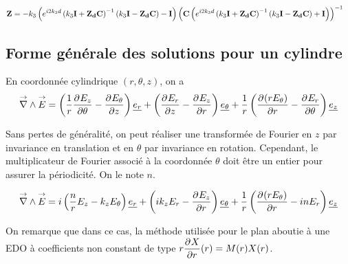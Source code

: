 \begin{align}
    \mat{Z}
    &=-k_3\left(e^{i2 k_3 d} \left(k_3\mat{I} + \mat{Z_d}\mat{C}\right)^{-1}\left(k_3\mat{I} - \mat{Z_d}\mat{C}\right) - \mat{I} \right)
    \left( \mat{C} \left( e^{i2 k_3 d} \left(k_3\mat{I} + \mat{Z_d}\mat{C}\right)^{-1}\left(k_3\mat{I} - \mat{Z_d}\mat{C}\right) + \mat{I} \right)\right)^{-1}
\end{align}







\subsection{Forme générale des solutions pour un cylindre}

\newcommand{\mr}{r}
\newcommand{\mt}{\theta}
\newcommand{\mz}{z}

\begin{figure}[htpb]
\centering
\begin{tikzpicture}

\end{tikzpicture}
\end{figure}

En coordonnée cylindrique $(r,\theta,z)$, on a
\begin{equation}
\vrot \vE = \left(\frac{1}{r}\ddr{\theta}{E_z} - \ddr{z}{E_\theta}\right)\v{e_r} + 
\left(\ddr{z}{E_r} - \ddr{r}{E_z}\right)\v{e_\theta} +
\frac{1}{r}\left(\ddr{r}{(rE_\theta)}-\ddr{\theta}{E_r}\right)\v{e_z}
\end{equation}

Sans pertes de généralité, on peut réaliser une transformée de Fourier en $z$ par invariance en translation et en $\theta$ par invariance en rotation. Cependant, le multiplicateur de Fourier associé à la coordonnée $\theta$ doit être un entier pour assurer la périodicité. On le note $n$.

\begin{equation}
\vrot \vE = i\left(\frac{n}{r}E_z - k_zE_\theta\right)\v{e_r} + 
\left(ik_zE_r - \ddr{r}{E_z}\right)\v{e_\theta} +
\frac{1}{r}\left(\ddr{r}{(rE_\theta)}-inE_r\right)\v{e_z}
\end{equation}

On remarque que dans ce cas, la méthode utilisée pour le plan aboutie à une EDO à coefficients non constant de type $r\ddr{r}{X}(r) = M(r)X(r)$.

